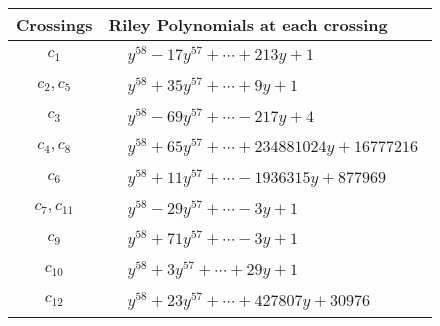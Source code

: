 \documentclass[1p]{elsarticle_modified}
\theoremstyle{definition}
\begin{document}
\begin{tabular}{m{50pt}|m{274pt}}
Crossings & \hspace{64pt}Riley Polynomials at each crossing \\
\hline $$\begin{aligned}c_{1}\end{aligned}$$&$\begin{aligned}
&y^{58}-17 y^{57}+\cdots+213 y+1
\end{aligned}$\\
\hline $$\begin{aligned}c_{2},c_{5}\end{aligned}$$&$\begin{aligned}
&y^{58}+35 y^{57}+\cdots+9 y+1
\end{aligned}$\\
\hline $$\begin{aligned}c_{3}\end{aligned}$$&$\begin{aligned}
&y^{58}-69 y^{57}+\cdots-217 y+4
\end{aligned}$\\
\hline $$\begin{aligned}c_{4},c_{8}\end{aligned}$$&$\begin{aligned}
&y^{58}+65 y^{57}+\cdots+234881024 y+16777216
\end{aligned}$\\
\hline $$\begin{aligned}c_{6}\end{aligned}$$&$\begin{aligned}
&y^{58}+11 y^{57}+\cdots-1936315 y+877969
\end{aligned}$\\
\hline $$\begin{aligned}c_{7},c_{11}\end{aligned}$$&$\begin{aligned}
&y^{58}-29 y^{57}+\cdots-3 y+1
\end{aligned}$\\
\hline $$\begin{aligned}c_{9}\end{aligned}$$&$\begin{aligned}
&y^{58}+71 y^{57}+\cdots-3 y+1
\end{aligned}$\\
\hline $$\begin{aligned}c_{10}\end{aligned}$$&$\begin{aligned}
&y^{58}+3 y^{57}+\cdots+29 y+1
\end{aligned}$\\
\hline $$\begin{aligned}c_{12}\end{aligned}$$&$\begin{aligned}
&y^{58}+23 y^{57}+\cdots+427807 y+30976
\end{aligned}$\\
\hline
\end{tabular}\\~\\
\end{document}
